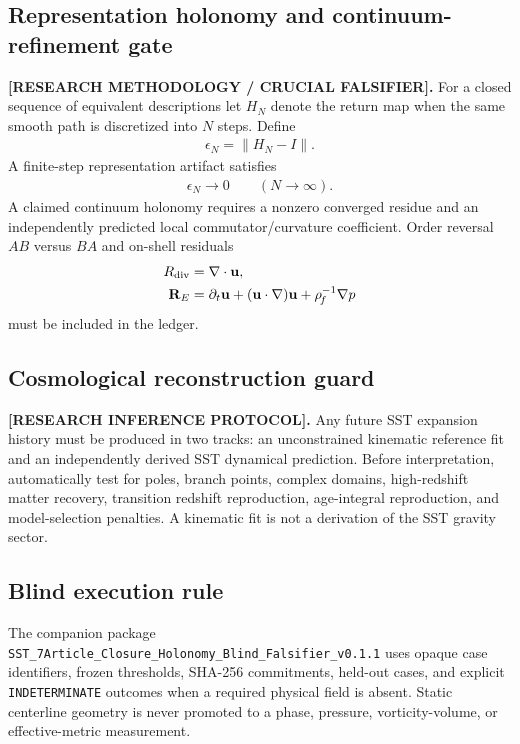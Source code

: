 \subsection{Representation holonomy and continuum-refinement gate}
\textbf{[RESEARCH METHODOLOGY / CRUCIAL FALSIFIER].}
For a closed sequence of equivalent descriptions let \(H_N\) denote the
return map when the same smooth path is discretized into \(N\) steps.  Define
\begin{align}
\epsilon_N=\|H_N-I\|.
\end{align}
A finite-step representation artifact satisfies
\begin{align}
\epsilon_N\rightarrow0
\qquad (N\rightarrow\infty).
\end{align}
A claimed continuum holonomy requires a nonzero converged residue and an
independently predicted local commutator/curvature coefficient.  Order reversal
\(AB\) versus \(BA\) and on-shell residuals
\begin{align}
R_{\rm div}&=\nabla\cdot\mathbf u,\\
\mathbf R_E&=\partial_t\mathbf u+(\mathbf u\cdot\nabla)\mathbf u
+\rho_{\!f}^{-1}\nabla p
\end{align}
must be included in the ledger.

\subsection{Cosmological reconstruction guard}
\textbf{[RESEARCH INFERENCE PROTOCOL].}
Any future SST expansion history must be produced in two tracks: an
unconstrained kinematic reference fit and an independently derived SST
dynamical prediction.  Before interpretation, automatically test for poles,
branch points, complex domains, high-redshift matter recovery, transition
redshift reproduction, age-integral reproduction, and model-selection
penalties.  A kinematic fit is not a derivation of the SST gravity sector.

\subsection{Blind execution rule}
The companion package
\texttt{SST\_7Article\_Closure\_Holonomy\_Blind\_Falsifier\_v0.1.1}
uses opaque case identifiers, frozen thresholds, SHA-256 commitments, held-out
cases, and explicit \texttt{INDETERMINATE} outcomes when a required physical
field is absent.  Static centerline geometry is never promoted to a phase,
pressure, vorticity-volume, or effective-metric measurement.
